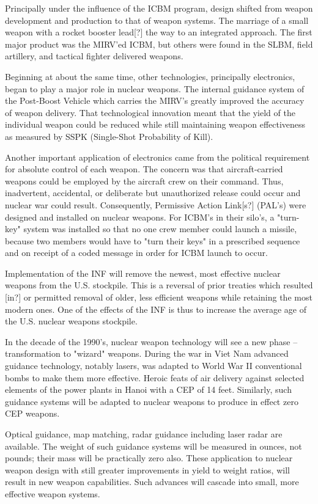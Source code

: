 Principally under the influence of the ICBM program, design shifted from weapon development and production to that of weapon systems. The marriage of a small weapon with a rocket booster lead[?] the way to an integrated approach. The first major product was the MIRV'ed ICBM, but others were found in the SLBM, field artillery, and tactical fighter delivered weapons.

Beginning at about the same time, other technologies, principally electronics, began to play a major role in nuclear weapons. The internal guidance system of the Post-Boost Vehicle which carries the MIRV's greatly improved the accuracy of weapon delivery. That technological innovation meant that the yield of the individual weapon could be reduced while still maintaining weapon effectiveness as measured by SSPK (Single-Shot Probability of Kill).

Another important application of electronics came from the political requirement for absolute control of each weapon. The concern was that aircraft-carried weapons could be employed by the aircraft crew on their command. Thus, inadvertent, accidental, or deliberate but unauthorized release could occur and nuclear war could result. Consequently, Permissive Action Link[s?] (PAL's) were designed and installed on nuclear weapons. For ICBM's in their silo's, a "turn-key" system was installed so that no one crew member could launch a missile, because two members would have to "turn their keys" in a prescribed sequence and on receipt of a coded message in order for ICBM launch to occur.

Implementation of the INF will remove the newest, most effective nuclear weapons from the U.S. stockpile. This is a reversal of prior treaties which resulted [in?] or permitted removal of older, less efficient weapons while retaining the most modern ones. One of the effects of the INF is thus to increase the average age of the U.S. nuclear weapons stockpile.

In the decade of the 1990's, nuclear weapon technology will see a new phase -- transformation to "wizard" weapons. During the war in Viet Nam advanced guidance technology, notably lasers, was adapted to World War II conventional bombs to make them more effective. Heroic feats of air delivery against selected elements of the power plants in Hanoi with a CEP of 14 feet. Similarly, such guidance systems will be adapted to nuclear weapons to produce in effect zero CEP weapons.

Optical guidance, map matching, radar guidance including laser radar are available. The weight of such guidance systems will be measured in ounces, not pounds; their mass will be practically zero also. These application to nuclear weapon design with still greater improvements in yield to weight ratios, will result in new weapon capabilities. Such advances will cascade into small, more effective weapon systems.


